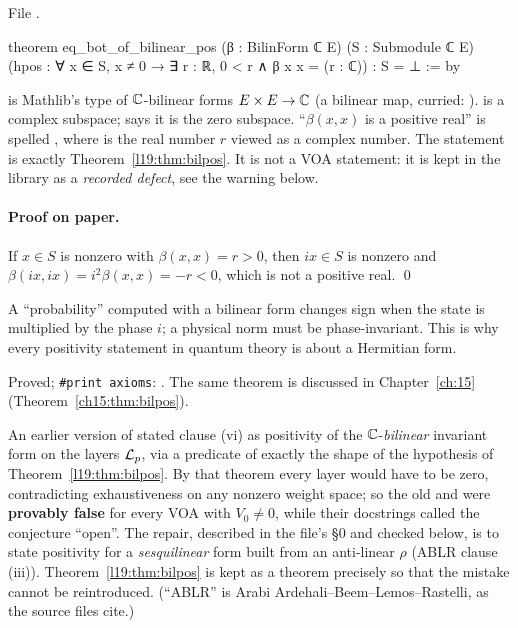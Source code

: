 \noindent File .
\begin{leancode}
theorem eq_bot_of_bilinear_pos (β : BilinForm ℂ E) (S : Submodule ℂ E)
    (hpos : ∀ x ∈ S, x ≠ 0 → ∃ r : ℝ, 0 < r ∧ β x x = (r : ℂ)) : S = ⊥ := by
\end{leancode}

\begin{dictionary}
 is Mathlib's type of ${\mathbb{C}}$-bilinear forms $E\times E\to{\mathbb{C}}$ (a bilinear map,
curried: ).  is a complex subspace;  says it is the zero
subspace. ``$\beta(x,x)$ is a positive real'' is spelled ,
where  is the real number $r$ viewed as a complex number. The statement is exactly
Theorem~\ref{l19:thm:bilpos}. It is not a VOA statement: it is kept in the library as a
\emph{recorded defect}, see the warning below.
\end{dictionary}

\paragraph{Proof on paper.} If $x\in S$ is nonzero with $\beta(x,x) = r>0$, then $ix\in S$ is
nonzero and $\beta(ix,ix) = i^2\beta(x,x) = -r<0$, which is not a positive real. \qed

\begin{physics}
A ``probability'' computed with a bilinear form changes sign when the state is multiplied by the
phase $i$; a physical norm must be phase-invariant. This is why every positivity statement in
quantum theory is about a Hermitian form.
\end{physics}

\begin{status}
Proved; \texttt{\#print axioms}: . The same theorem is
discussed in Chapter~\ref{ch:15} (Theorem~\ref{ch15:thm:bilpos}).
\end{status}

\begin{warning}[title={Recorded defect, now repaired: the old clause (vi) was false for every VOA}]\label{l19:warn:olddefect}
An earlier version of  stated clause (vi) as positivity
of the ${\mathbb{C}}$-\emph{bilinear} invariant form on the layers $\mathcal{L}_p$, via a predicate
 of exactly the shape of the hypothesis of
Theorem~\ref{l19:thm:bilpos}. By that theorem every layer would have to be zero, contradicting
exhaustiveness on any nonzero weight space; so the old  and
 were \textbf{provably false} for every VOA with $V_0\ne0$, while their
docstrings called the conjecture ``open''. The repair, described in the file's §0 and
checked below, is to state positivity for a \emph{sesquilinear} form built from an anti-linear
$\rho$ (ABLR clause (iii)). Theorem~\ref{l19:thm:bilpos} is kept as a theorem precisely so that the
mistake cannot be reintroduced. (``ABLR'' is Arabi Ardehali--Beem--Lemos--Rastelli, as the source files cite.)
\end{warning}

